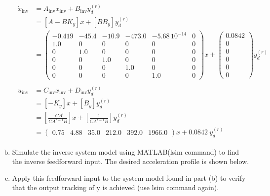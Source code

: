 \documentclass[12pt]{article}
\begin{document}
\begin{enumerate}[(a)]
    \begin{align}
      \begin{split}
      \dot{x}_\text{inv} &= A_\text{inv} x_\text{inv} + B_\text{inv} y^{(r)}_d \\
             &= [A - BK_y] x + [BB_y] y^{(r)}_d \\
             &= \left(\begin{array}{cccccc} -0.419 & -45.4 & -10.9 & -473.0 & -5.68\,{10}^{-14} & 0\\ 1.0 & 0 & 0 & 0 & 0 & 0\\ 0 & 1.0 & 0 & 0 & 0 & 0\\ 0 & 0 & 1.0 & 0 & 0 & 0\\ 0 & 0 & 0 & 1.0 & 0 & 0\\ 0 & 0 & 0 & 0 & 1.0 & 0 \end{array}\right) x + \left(\begin{array}{c} 0.0842\\ 0\\ 0\\ 0\\ 0\\ 0 \end{array}\right) y^{(r)}_d
      \end{split}
      \\[2ex]
      \begin{split}
      u_\text{inv} &= C_\text{inv} x_\text{inv} + D_\text{inv} y^{(r)}_d \\
             &= [-K_y] x + [B_y] y^{(r)}_d \\
             &= [\frac{-CA^r}{CA^{r-1}B}] x + [\frac{1}{CA^{r-1}B}] y^{(r)}_d \\
             &= \left(\begin{array}{cccccc} 0.75 & 4.88 & 35.0 & 212.0 & 392.0 & 1966.0 \end{array}\right) x + 0.0842\ y^{(r)}_d
      \end{split}
    \end{align}

    \clearpage

    \item Simulate the inverse system model using MATLAB(lsim command) to find the inverse feedforward input. The desired acceleration profile is shown below.
    \item Apply this feedforward input to the system model found in part (b) to verify that the output tracking of y is achieved (use lsim command again).


\end{enumerate}
\end{document}
